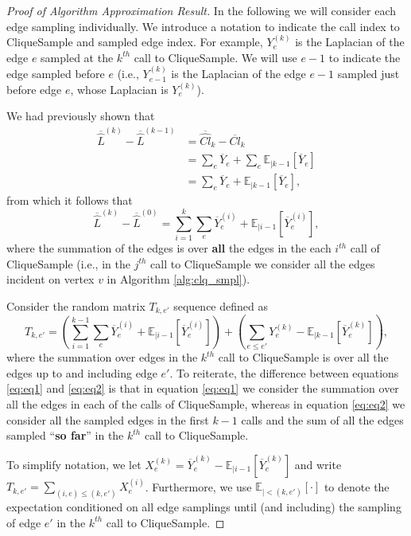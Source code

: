 \documentclass[11pt]{article}
\newcommand{\CExp}[1]{\mathbb{E}_{|#1}}
\newcommand{\naL}[1]{\overline{\widehat{L}}^{(#1)}}
\begin{document}
\begin{proof}[Proof of Algorithm Approximation Result]
In the following we will consider each edge sampling individually. We introduce a notation to indicate the call index to CliqueSample and sampled edge index. For example, $ Y_{e}^{(k)} $ is the Laplacian of the edge $ e $ sampled at the $ k^{th} $ call to CliqueSample. We will use $ e - 1 $ to indicate the edge sampled before $ e $ (i.e., $ Y_{e-1}^{(k)} $ is the Laplacian of the edge $ e - 1 $ sampled just before edge $ e $, whose Laplacian is $ Y_{e}^{(k)} $).

We had previously shown that 
\begin{align*}
\naL{k} - \naL{k-1} &= \overline{\widehat{Cl}}_{k} - \overline{Cl}_{k} \\
&= \sum_{e}\overline{Y}_{e} + \sum_{e}\CExp{k-1}\left[\overline{Y}_{e}\right] \\
&= \sum_{e}\overline{Y}_{e} + \CExp{k-1}\left[\overline{Y}_{e}\right], 
\end{align*}
from which it follows that 
\begin{equation}\label{eq:eq1}
\naL{k} - \naL{0} = \sum_{i=1}^{k}\sum_{e}\overline{Y}_{e}^{(i)} + \CExp{i-1}\left[\overline{Y}_{e}^{(i)}\right],
\end{equation}
where the summation of the edges is over \textbf{all} the edges in the each $ i^{th} $ call of CliqueSample (i.e., in the $ j^{th} $ call to CliqueSample we consider all the edges incident on vertex $ v $ in Algorithm \ref{alg:clq_smpl}).


Consider the random matrix $ T_{k,e'} $ sequence defined as
\begin{equation}\label{eq:eq2}
T_{k,e'} = \left(\sum_{i=1}^{k-1}\sum_{e}\overline{Y}_{e}^{(i)} + \CExp{i-1}\left[\overline{Y}_{e}^{(i)}\right]\right) + \left(\sum_{e \leq e'}Y_{e}^{(k)} - \CExp{k-1}\left[\overline{Y}_{e}^{(k)}\right]\right),
\end{equation}
where the summation over edges in the $ k^{th} $ call to CliqueSample is over all the edges up to and including edge $ e' $. To reiterate, the difference between equations \ref{eq:eq1} and \ref{eq:eq2} is that in equation \ref{eq:eq1} we consider the summation over all the edges in each of the calls of CliqueSample, whereas in equation \ref{eq:eq2} we consider all the sampled edges in the first $ k-1 $ calls and the sum of all the edges sampled ``\textbf{so far}'' in the $ k^{th} $ call to CliqueSample.

To simplify notation, we let $ X_{e}^{(k)} = \overline{Y}_{e}^{(k)} - \CExp{i-1}\left[\overline{Y}_{e}^{(k)}\right] $ and write $ T_{k,e'} = \sum_{(i,e) \leq (k,e')}X_{e}^{(i)} $. Furthermore, we use $ \CExp{<(k,e')}[\cdot] $ to denote the expectation conditioned on all edge samplings until (and including) the sampling of edge $ e' $ in the $ k^{th} $ call to CliqueSample.


\end{proof}
\end{document}
